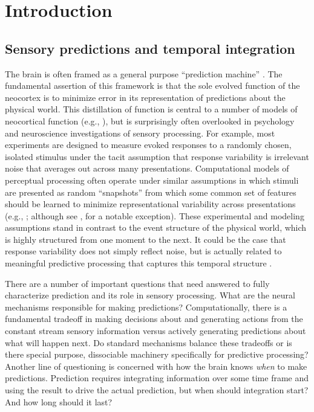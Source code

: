 \documentclass[dwyatte_dissertation.tex]{subfiles}
\begin{document}
\sloppy

\chapter{Introduction}
\label{chap:intro}

\section{Sensory predictions and temporal integration}
The brain is often framed as a general purpose ``prediction machine'' \cite{HawkinsBlakeslee04,Clark13}. The fundamental assertion of this framework is that the sole evolved function of the neocortex is to minimize error in its representation of predictions about the physical world. This distillation of function is central to a number of models of neocortical function (e.g., ), but is surprisingly often overlooked in psychology and neuroscience investigations of sensory processing. For example, most experiments are designed to measure evoked responses to a randomly chosen, isolated stimulus under the tacit assumption that response variability is irrelevant noise that averages out across many presentations. Computational models of perceptual processing often operate under similar assumptions in which stimuli are presented as random ``snapshots'' from which some common set of features should be learned to minimize representational variability across presentations (e.g., ; although see , for a notable exception). These experimental and modeling assumptions stand in contrast to the event structure of the physical world, which is highly structured from one moment to the next. It could be the case that response variability does not simply reflect noise, but is actually related to meaningful predictive processing that captures this temporal structure \cite{ArieliSterkinGrinvaldEtAl96,WilderJonesAhmedEtAl13,FischerWhitney14}.

There are a number of important questions that need answered to fully characterize prediction and its role in sensory processing. What are the neural mechanisms responsible for making predictions? Computationally, there is a fundamental tradeoff in making decisions about and generating actions from the constant stream sensory information versus actively generating predictions about what will happen next. Do standard mechanisms balance these tradeoffs or is there special purpose, dissociable machinery specifically for predictive processing? Another line of questioning is concerned with how the brain knows \textit{when} to make predictions. Prediction requires integrating information over some time frame and using the result to drive the actual prediction, but when should integration start? And how long should it last? 
\end{document}
